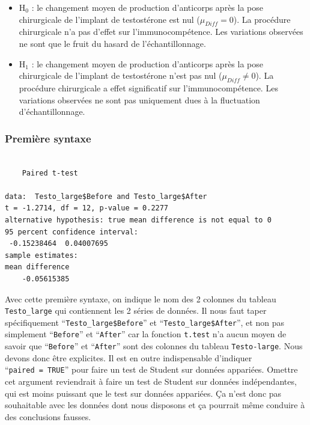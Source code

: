 \documentclass[
  french,
  a4paper,
  DIV=11,
  numbers=noendperiod,
  oneside]{scrreprt}
\newenvironment{Shaded}{}{}
\newcommand{\AttributeTok}[1]{\textcolor[rgb]{0.84,0.23,0.29}{#1}}
\newcommand{\CommentTok}[1]{\textcolor[rgb]{0.42,0.45,0.49}{#1}}
\newcommand{\ConstantTok}[1]{\textcolor[rgb]{0.00,0.36,0.77}{#1}}
\newcommand{\FunctionTok}[1]{\textcolor[rgb]{0.44,0.26,0.76}{#1}}
\newcommand{\NormalTok}[1]{\textcolor[rgb]{0.14,0.16,0.18}{#1}}
\newcommand{\SpecialCharTok}[1]{\textcolor[rgb]{0.00,0.36,0.77}{#1}}
\providecommand{\tightlist}{%
  \setlength{\itemsep}{0pt}\setlength{\parskip}{0pt}}
\begin{document}
\begin{itemize}
\tightlist
\item
  H\(_0\) : le changement moyen de production d'anticorps après la pose
  chirurgicale de l'implant de testostérone est nul
  (\(\mu_{Diff} = 0\)). La procédure chirurgicale n'a pas d'effet sur
  l'immunocompétence. Les variations observées ne sont que le fruit du
  hasard de l'échantillonnage.
\item
  H\(_1\) : le changement moyen de production d'anticorps après la pose
  chirurgicale de l'implant de testostérone n'est pas nul
  (\(\mu_{Diff} \neq 0\)). La procédure chirurgicale a effet
  significatif sur l'immunocompétence. Les variations observées ne sont
  pas uniquement dues à la fluctuation d'échantillonnage.
\end{itemize}

\subsubsection{Première syntaxe}\label{premiuxe8re-syntaxe}

\begin{Shaded}
\end{Shaded}

\begin{verbatim}

    Paired t-test

data:  Testo_large$Before and Testo_large$After
t = -1.2714, df = 12, p-value = 0.2277
alternative hypothesis: true mean difference is not equal to 0
95 percent confidence interval:
 -0.15238464  0.04007695
sample estimates:
mean difference 
    -0.05615385 
\end{verbatim}

Avec cette première syntaxe, on indique le nom des 2 colonnes du tableau
\texttt{Testo\_large} qui contiennent les 2 séries de données. Il nous
faut taper spécifiquement ``\texttt{Testo\_large\$Before}'' et
``\texttt{Testo\_large\$After}'', et non pas simplement
``\texttt{Before}'' et ``\texttt{After}'' car la fonction
\texttt{t.test} n'a aucun moyen de savoir que ``\texttt{Before}'' et
``\texttt{After}'' sont des colonnes du tableau \texttt{Testo-large}.
Nous devons donc être explicites. Il est en outre indispensable
d'indiquer ``\texttt{paired\ =\ TRUE}'' pour faire un test de Student
sur données appariées. Omettre cet argument reviendrait à faire un test
de Student sur données indépendantes, qui est moins puissant que le test
sur données appariées. Ça n'est donc pas souhaitable avec les données
dont nous disposons et ça pourrait même conduire à des conclusions
fausses.
\end{document}

